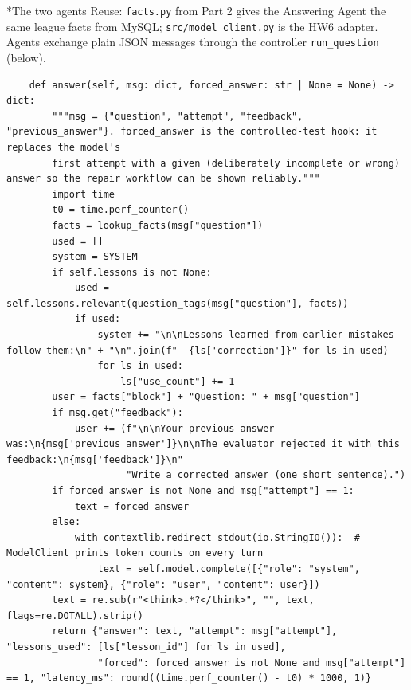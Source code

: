 \documentclass[11pt]{article}
\makeatletter
\renewcommand\subsection{\@startsection{subsection}{2}{\z@}{-2.2ex \@plus -1ex \@minus -.2ex}{0.8ex \@plus.2ex}{\normalfont\fontsize{12}{14.5}\selectfont\bfseries}}
\makeatother
\begin{document}
\subsection*{The two agents}
Reuse: \texttt{facts.py} from Part 2 gives the Answering Agent the same league facts from MySQL; \texttt{src/\allowbreak{}model\_\allowbreak{}client.py} is the HW6 adapter. Agents exchange plain JSON messages through the controller \texttt{run\_\allowbreak{}question} (below).

\begingroup\lstset{basicstyle=\ttfamily\tiny}
\begin{lstlisting}
    def answer(self, msg: dict, forced_answer: str | None = None) -> dict:
        """msg = {"question", "attempt", "feedback", "previous_answer"}. forced_answer is the controlled-test hook: it replaces the model's
        first attempt with a given (deliberately incomplete or wrong) answer so the repair workflow can be shown reliably."""
        import time
        t0 = time.perf_counter()
        facts = lookup_facts(msg["question"])
        used = []
        system = SYSTEM
        if self.lessons is not None:
            used = self.lessons.relevant(question_tags(msg["question"], facts))
            if used:
                system += "\n\nLessons learned from earlier mistakes - follow them:\n" + "\n".join(f"- {ls['correction']}" for ls in used)
                for ls in used:
                    ls["use_count"] += 1
        user = facts["block"] + "Question: " + msg["question"]
        if msg.get("feedback"):
            user += (f"\n\nYour previous answer was:\n{msg['previous_answer']}\n\nThe evaluator rejected it with this feedback:\n{msg['feedback']}\n"
                     "Write a corrected answer (one short sentence).")
        if forced_answer is not None and msg["attempt"] == 1:
            text = forced_answer
        else:
            with contextlib.redirect_stdout(io.StringIO()):  # ModelClient prints token counts on every turn
                text = self.model.complete([{"role": "system", "content": system}, {"role": "user", "content": user}])
        text = re.sub(r"<think>.*?</think>", "", text, flags=re.DOTALL).strip()
        return {"answer": text, "attempt": msg["attempt"], "lessons_used": [ls["lesson_id"] for ls in used],
                "forced": forced_answer is not None and msg["attempt"] == 1, "latency_ms": round((time.perf_counter() - t0) * 1000, 1)}
\end{lstlisting}
\endgroup
\begingroup\lstset{basicstyle=\ttfamily\tiny}
\end{document}
